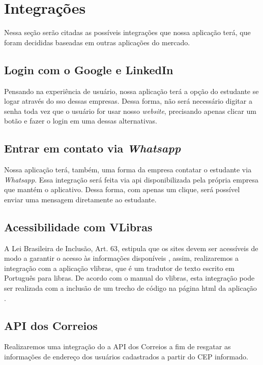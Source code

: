 \section{Integrações}
Nessa seção serão citadas as possíveis integrações que nossa aplicação terá, que foram decididas baseadas em outras aplicações do mercado.

\subsection{Login com o Google e LinkedIn}
Pensando na experiência de usuário, nossa aplicação terá a opção do estudante se logar através do \ac{sso} dessas empresas. Dessa forma, não será necessário digitar a senha toda vez que o usuário for usar nosso \emph{website}, precisando apenas clicar um botão e fazer o login em uma dessas alternativas.

\subsection{Entrar em contato via \emph{Whatsapp}}
Nossa aplicação terá, também, uma forma da empresa contatar o estudante via \emph{Whatsapp}. Essa integração será feita via \ac{api} disponibilizada pela própria empresa que mantém o aplicativo. Dessa forma, com apenas um clique, será possível enviar uma mensagem diretamente ao estudante.

\subsection{Acessibilidade com VLibras}
A Lei Brasileira de Inclusão, Art. 63, estipula que os sites devem ser acessíveis de modo a garantir o acesso às informações disponíveis \cite{leiinclusao}, assim, realizaremos a integração com a aplicação \gls{vlibras}, que é um tradutor de texto escrito em Português para \ac{libras}. De acordo com o manual do \gls{vlibras}, esta integração pode ser realizada com a inclusão de um trecho de código na página \ac{html} da aplicação \cite{manualvlibras}.

\subsection{API dos Correios}
Realizaremos uma integração do a \ac{API} dos Correios a fim de resgatar as informações de endereço dos usuários cadastrados a partir do CEP informado.